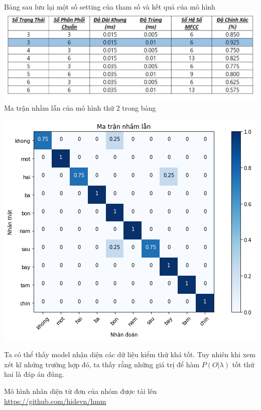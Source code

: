 \documentclass[13pt]{extreport}
\begin{document}
Bảng sau lưu lại một số setting của tham số và kết quả của mô hình \\ 
\includegraphics[scale=.6]{thongke.PNG} \\
Ma trận nhầm lẫn của mô hình thứ 2 trong bảng \\
\begin{center}
\includegraphics[scale=.5]{confumatrix.png}
\end{center}
Ta có thể thấy model nhận diện các dữ liệu kiểm thử khá tốt. Tuy nhiên khi xem xét kĩ nhứng trường hợp đó, ta thấy rằng những giá trị để hàm $P(O | \lambda)$ tốt thứ hai là đáp án đúng.

Mô hình nhân diện từ đơn của nhóm được tải lên 
\href{url}{https://github.com/hidevn/hmm}





 
\end{document}
